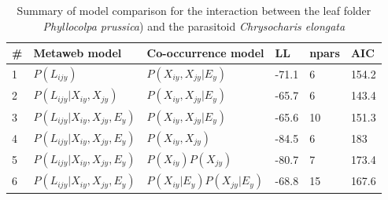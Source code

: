 \documentclass[12pt]{article}
\begin{document}
\newpage



\newpage

\begin{landscape}
\begin{table}[]
\centering
\caption{Summary of model comparison for the interaction between the leaf
folder \textit{Phyllocolpa prussica}) and the parasitoid \textit{Chrysocharis
elongata}}
\begin{tabular}{llllll}
\hline
	\# & Metaweb model 						& Co-occurrence model 			& LL 	& npars & AIC \\ \hline
	1 & $P(L_{ijy})$ 						& $P(X_{iy},X_{jy}|E_y)$ 		& -71.1 & 6 	& 154.2 \\
	2 & $P(L_{ijy} | X_{iy}, X_{jy})$ 		& $P(X_{iy},X_{jy}|E_y)$ 		& -65.7 & 6 	& 143.4 \\
	3 & $P(L_{ijy} | X_{iy}, X_{jy}, E_y)$ & $P(X_{iy},X_{jy}|E_y)$ 		& -65.6 & 10 	& 151.3 \\ \hline
	4 & $P(L_{ijy} | X_{iy}, X_{jy}, E_y)$ & $P(X_{iy},X_{jy})$ 			& -84.5 & 6 	& 183 \\
	5 & $P(L_{ijy} | X_{iy}, X_{jy}, E_y)$ & $P(X_{iy})P(X_{jy})$ 			& -80.7 & 7 	& 173.4 \\
	6 & $P(L_{ijy} | X_{iy}, X_{jy}, E_y)$ & $P(X_{iy}|E_y)P(X_{jy}|E_y)$ 	& -68.8 & 15 	& 167.6 \\
\end{tabular}
\end{table}
\end{landscape}

\newpage
\end{document}
